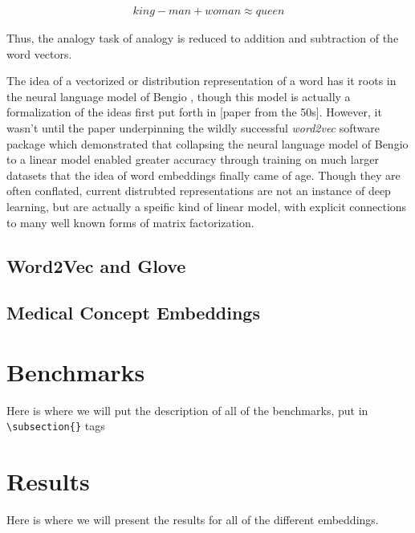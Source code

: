 \documentclass{ws-procs11x85}
\begin{document}
\begin{align}
king - man + woman \approx queen
\end{align}

Thus, the analogy task of analogy is reduced to addition and subtraction of the word vectors.

The idea of a vectorized or distribution representation of a word has it roots in the neural language model of Bengio \cite{bengio2003neural}, though this model is actually a formalization of the ideas first put forth in [paper from the 50s]. However, it wasn't until the paper\cite{mikolov2013distributed} underpinning the wildly successful \emph{word2vec} software package which demonstrated that collapsing the neural language model of Bengio\cite{bengio2003neural} to a linear model enabled greater accuracy through training on much larger datasets that the idea of word embeddings finally came of age. Though they are often conflated, current distrubted representations are not an instance of deep learning, but are actually a speific kind of linear model, with explicit connections to many well known forms of matrix factorization\cite{levy2014neural}.

 \subsection{Word2Vec and Glove}

 \subsection{Medical Concept Embeddings}

\section{Benchmarks}
Here is where we will put the description of all of the benchmarks, put in \verb|\subsection{}| tags

\section{Results}
Here is where we will present the results for all of the different embeddings.




\end{document}
